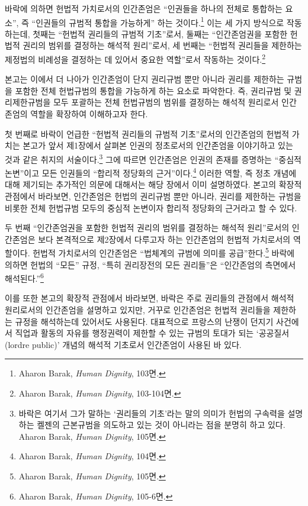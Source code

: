 바락에 의하면 헌법적 가치로서의 인간존엄은 ``인권들을 하나의 전체로 통합하는 요소'', 즉 ``인권들의 규범적 통합을 가능하게'' 하는 것이다.\footnote{Aharon Barak, \emph{Human Dignity}, 103면.} 이는 세 가지 방식으로 작동하는데, 첫째는 ``헌법적 권리들의 규범적 기초''로서, 둘째는 ``인간존엄권을 포함한 헌법적 권리의 범위를 결정하는 해석적 원리''로서, 세 번째는 ``헌법적 권리들을 제한하는 제정법의 비례성을 결정하는 데 있어서 중요한 역할''로서 작동하는 것이다.\footnote{Aharon Barak, \emph{Human Dignity}, 103-104면.}

본고는 이에서 더 나아가 인간존엄이 단지 권리규범 뿐만 아니라 권리를 제한하는 규범을 포함한 전체 헌법규범의 통합을 가능하게 하는 요소로 파악한다. 즉, 권리규범 및 권리제한규범을 모두 포괄하는 전체 헌법규범의 범위를 결정하는 해석적 원리로서 인간존엄의 역할을 확장하여 이해하고자 한다.

첫 번째로 바락이 언급한 ``헌법적 권리들의 규범적 기초''로서의 인간존엄의 헌법적 가치는 본고가 앞서 제1장에서 살펴본 인권의 정초로서의 인간존엄을 이야기하고 있는 것과 같은 취지의 서술이다.\footnote{바락은 여기서 그가 말하는 `권리들의 기초'라는 말의 의미가 헌법의 구속력을 설명하는 켈젠의 근본규범을 의도하고 있는 것이 아니라는 점을 분명히 하고 있다. Aharon Barak, \emph{Human Dignity}, 105면.} 그에 따르면 인간존엄은 인권의 존재를 증명하는 ``중심적 논변''이고 모든 인권들의 ``합리적 정당화의 근거''이다.\footnote{Aharon Barak, \emph{Human Dignity}, 104면.} 이러한 역할, 즉 정초 개념에 대해 제기되는 추가적인 의문에 대해서는 해당 장에서 이미 설명하였다. 본고의 확장적 관점에서 바라보면, 인간존엄은 헌법의 권리규범 뿐만 아니라, 권리를 제한하는 규범을 비롯한 전체 헌법규범 모두의 중심적 논변이자 합리적 정당화의 근거라고 할 수 있다.

두 번째 ``인간존엄권을 포함한 헌법적 권리의 범위를 결정하는 해석적 원리''로서의 인간존엄은 보다 본격적으로 제2장에서 다루고자 하는 인간존엄의 헌법적 가치로서의 역할이다. 헌법적 가치로서의 인간존엄은 ``법체계의 규범에 의미를 공급''한다.\footnote{Aharon Barak, \emph{Human Dignity}, 105면.} 바락에 의하면 헌법의 ``모든'' 규정, ``특히 권리장전의 모든 권리들''은 ``인간존엄의 측면에서 해석된다.''\footnote{Aharon Barak, \emph{Human Dignity}, 105-6면.}

이를 또한 본고의 확장적 관점에서 바라보면, 바락은 주로 권리들의 관점에서 해석적 원리로서의 인간존엄을 설명하고 있지만, 거꾸로 인간존엄은 헌법적 권리들을 제한하는 규정을 해석하는데 있어서도 사용된다. 대표적으로 프랑스의 난쟁이 던지기 사건에서 직업과 활동의 자유를 행정권력이 제한할 수 있는 규범의 토대가 되는 `공공질서(l\textquotesingle ordre public)' 개념의 해석적 기초로서 인간존엄이 사용된 바 있다.

